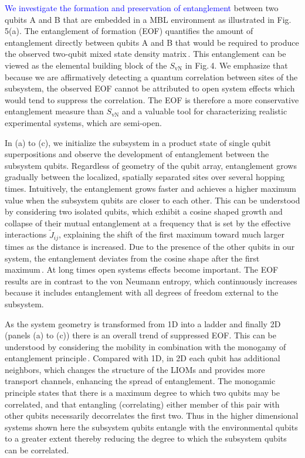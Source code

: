 \textcolor{blue}{We investigate the formation and preservation of entanglement} between two qubits A and B that are embedded in a MBL environment as illustrated in Fig.\,5(a). The entanglement of formation (EOF) quantifies the amount of entanglement directly between qubits A and B that would be required to produce the observed two-qubit mixed state density matrix\,\cite{Wootters1998}.   This entanglement can be viewed as the elemental building block of the $S_{\text{vN}}$ in Fig.\,4. We emphasize that because we are affirmatively detecting a quantum correlation between sites of the subsystem, the observed EOF cannot be attributed to open system effects which would tend to suppress the correlation.  The EOF is therefore a more conservative entanglement measure than $S_{\text{vN}}$ and a valuable tool for characterizing realistic experimental systems, which are semi-open.

In (a) to (c), we initialize the subsystem in a product state of single qubit superpositions and observe the development of entanglement between the subsystem qubits. Regardless of geometry of the qubit array, entanglement grows gradually between the localized, spatially separated sites over several hopping times.  Intuitively, the entanglement grows faster and achieves a higher maximum value when the subsystem qubits are closer to each other. This can be understood by considering two isolated qubits, which exhibit a cosine shaped growth and collapse of their mutual entanglement at a frequency that is set by the effective interactions $\widetilde{J}_{ij}$, explaining the shift of the first maximum toward much larger times as the distance is increased. Due to the presence of the other qubits in our system, the entanglement deviates from the cosine shape after the first maximum\,\cite{Serbyn2013b}.  At long times open systems effects become important. The EOF results are in contrast to the von Neumann entropy, which continuously increases because it includes entanglement with all degrees of freedom external to the subsystem.

As the system geometry is transformed from 1D into a ladder and finally 2D (panels (a) to (c)) there is an overall trend of suppressed EOF.  This can be understood by considering the mobility in combination with the monogamy of entanglement principle\,\cite{Wootters2000}. Compared with 1D, in 2D each qubit has additional neighbors, which changes the structure of the LIOMs and provides more transport channels, enhancing the spread of entanglement.  The monogamic principle states that there is a maximum degree to which two qubits may be correlated, and that entangling (correlating) either member of this pair with other qubits necessarily decorrelates the first two.  Thus in the higher dimensional systems shown here the subsystem qubits entangle with the environmental qubits to a greater extent thereby reducing the degree to which the subsystem qubits can be correlated.

